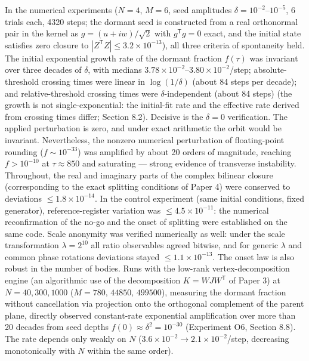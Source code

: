 \documentclass[
  a4paper,
]{article}
\begin{document}
In the numerical experiments (\(N=4\), \(M=6\), seed amplitudes
\(\delta=10^{-2}\)--\(10^{-5}\), 6 trials each, 4320 steps; the dormant
seed is constructed from a real orthonormal pair in the kernel as
\(g=(u+iw)/\sqrt2\) with \(g^{\mathsf T}g=0\) exact, and the initial
state satisfies zero closure to
\(|Z^{\mathsf T}Z|\le3.2\times10^{-13}\)), all three criteria of
spontaneity held. The initial exponential growth rate of the dormant
fraction \(f(\tau)\) was invariant over three decades of \(\delta\),
with medians \(3.78\times10^{-2}\)--\(3.80\times10^{-2}\)/step;
absolute-threshold crossing times were linear in \(\log(1/\delta)\)
(about 84 steps per decade); and relative-threshold crossing times were
\(\delta\)-independent (about 84 steps) (the growth is not
single-exponential: the initial-fit rate and the effective rate derived
from crossing times differ; Section 8.2). Decisive is the \(\delta=0\)
verification. The applied perturbation is zero, and under exact
arithmetic the orbit would be invariant. Nevertheless, the nonzero
numerical perturbation of floating-point rounding (\(f\sim10^{-33}\))
was amplified by about 20 orders of magnitude, reaching \(f>10^{-10}\)
at \(\tau\approx850\) and saturating --- strong evidence of transverse
instability. Throughout, the real and imaginary parts of the complex
bilinear closure (corresponding to the exact splitting conditions of
Paper 4) were conserved to deviations \(\le1.8\times10^{-14}\). In the
control experiment (same initial conditions, fixed generator),
reference-register variation was \(\le4.5\times10^{-11}\): the numerical
reconfirmation of the no-go and the onset of splitting were established
on the same code. Scale anonymity was verified numerically as well:
under the scale transformation \(\lambda=2^{10}\) all ratio observables
agreed bitwise, and for generic \(\lambda\) and common phase rotations
deviations stayed \(\le1.1\times10^{-13}\). The onset law is also robust
in the number of bodies. Runs with the low-rank vertex-decomposition
engine (an algorithmic use of the decomposition \(K=WJW^{\mathsf T}\) of
Paper 3) at \(N=40,300,1000\) (\(M=780,\,44850,\,499500\)), measuring
the dormant fraction without cancellation via projection onto the
orthogonal complement of the parent plane, directly observed
constant-rate exponential amplification over more than 20 decades from
seed depths \(f(0)\approx\delta^2=10^{-30}\) (Experiment O6, Section
8.8). The rate depends only weakly on \(N\)
(\(3.6\times10^{-2}\to2.1\times10^{-2}\)/step, decreasing monotonically
with \(N\) within the same order).
\end{document}
